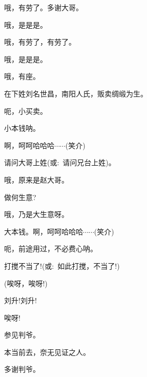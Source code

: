 {{哦，有劳了。多谢大哥。}

{哦，是是是。}

{哦，有劳了，有劳了。}

{哦，是是是。}

{哦，有座。}

{在下姓刘名世昌，南阳人氏，贩卖绸缎为生。}

{呃，小买卖。}

{小本钱呐。}

{啊，呵呵哈哈哈$\cdots{}\cdots{}$({\hwfs 笑介})}

{请问大哥上姓({\akai 或}:~请问兄台上姓)。}

{哦，原来是赵大哥。}

{做何生意?}

{哦，乃是大生意呀。}

{大本钱。啊，呵呵哈哈哈$\cdots{}\cdots{}$({\hwfs 笑介})}

{呃，前途用过，不必费心呐。}

{打搅不当了!({\akai 或}:~如此打搅，不当了!)}



{(唉呀，唉呀!)}



{刘升!刘升!}

{唉呀!}




\vspace{5pt}

{参见判爷。}

{本当前去，奈无见证之人。}

{多谢判爷。}

\vspace{5pt}

}
